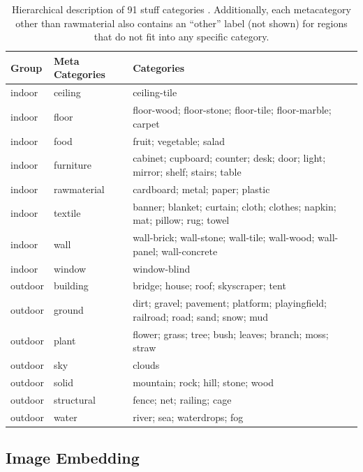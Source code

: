 \documentclass[10pt, a4paper]{article}
\begin{document}
\begin{table}[ht!]
\centering
\begin{tabular}{lll}
 \hline
\textbf{Group} & \textbf{Meta Categories} & \textbf{Categories} \\
 \hline
 indoor & ceiling & ceiling-tile \\
 indoor & floor & floor-wood; floor-stone; floor-tile; floor-marble; carpet \\
 indoor & food & fruit; vegetable; salad \\
 indoor & furniture & cabinet; cupboard; counter; desk; door; light; mirror; shelf; stairs; table \\
 indoor & rawmaterial & cardboard; metal; paper; plastic \\
 indoor & textile & banner; blanket; curtain; cloth; clothes; napkin; mat; pillow; rug; towel \\
 indoor & wall & wall-brick; wall-stone; wall-tile; wall-wood; wall-panel; wall-concrete \\
 indoor & window & window-blind \\ \hline
 outdoor & building & bridge; house; roof; skyscraper; tent \\
 outdoor & ground & dirt; gravel; pavement; platform; playingfield; railroad; road; sand; snow; mud \\
 outdoor & plant & flower; grass; tree; bush; leaves; branch; moss; straw \\
 outdoor & sky & clouds \\
 outdoor & solid & mountain; rock; hill; stone; wood \\
 outdoor & structural & fence; net; railing; cage \\
 outdoor & water & river; sea; waterdrops; fog \\
  \hline
\end{tabular}
\caption{Hierarchical description of 91 stuff categories \protect\cite{caesar2018coco}.
Additionally, each metacategory other than rawmaterial also contains an ``other'' label
(not shown) for regions that do not fit into any specific category.}
\label{tab:categories}
\end{table}

\subsection{Image Embedding}
\end{document}
